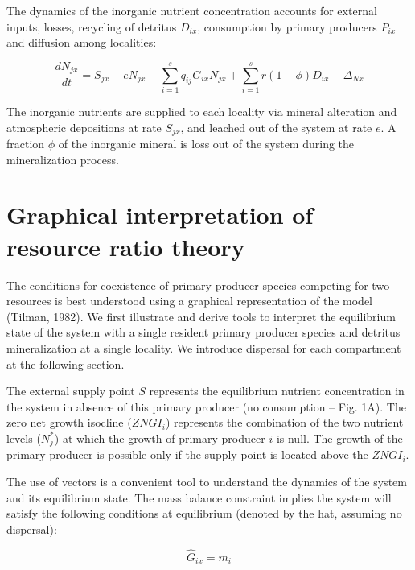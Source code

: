 \documentclass[12pt]{paper}
\begin{document}
The dynamics of the inorganic nutrient concentration accounts for external inputs, losses, recycling of detritus $D_{ix}$, consumption by primary producers $P_{ix}$ and diffusion among localities: 

\begin{equation}
	\label{e:bnet}
	\frac{dN_{jx}}{dt}=S_{jx}-eN_{jx}-\sum_{i=1}^{s}q_{ij}G_{ix}N_{jx}+\sum_{i=1}^{s}r(1-\phi)D_{ix}-\Delta_{Nx}
\end{equation}

The inorganic nutrients are supplied to each locality via mineral alteration and atmospheric depositions at rate $S_{jx}$, and leached out of the system at rate $e$. A fraction $\phi$ of the inorganic mineral is loss out of the system during the mineralization process.

\section{Graphical interpretation of resource ratio theory}

The conditions for coexistence of primary producer species competing for two resources is best understood using a graphical representation of the model (Tilman, 1982). We first illustrate and derive tools to interpret the equilibrium state of the system with a single resident primary producer species and detritus mineralization at a single locality. We introduce dispersal for each compartment at the following section. 

The external supply point $S$ represents the equilibrium nutrient concentration in the system in absence of this primary producer (no consumption – Fig. 1A). The zero net growth isocline ($ZNGI_i$) represents the combination of the two nutrient levels ($N_{j}^*$) at which the growth of primary producer $i$ is null. The growth of the primary producer is possible only if the supply point is located above the $ZNGI_i$. 

The use of vectors is a convenient tool to understand the dynamics of the system and its equilibrium state. The mass balance constraint implies the system will satisfy the following conditions at equilibrium (denoted by the hat, assuming no dispersal):

\begin{equation}
	\label{e:bnet}
	\widehat{G} _{ix}= m_{i} 
\end{equation}
\end{document}
